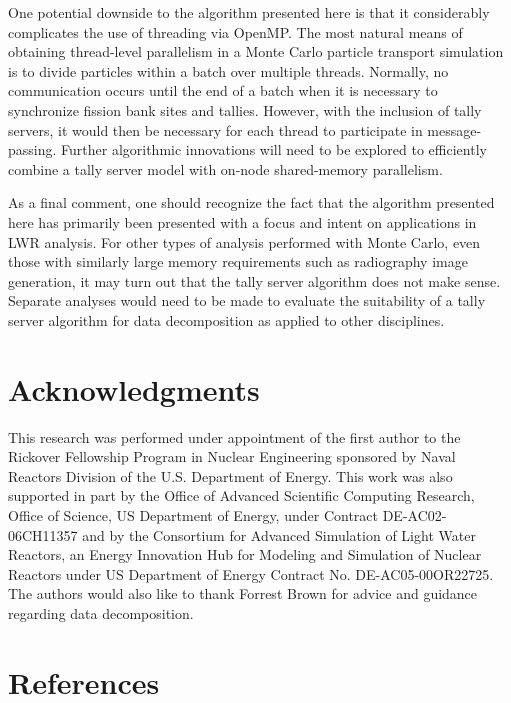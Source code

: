 \documentclass[3p,fleqn]{elsarticle}
\begin{document}
One potential downside to the algorithm presented here is that it considerably
complicates the use of threading via OpenMP. The most natural means of obtaining
thread-level parallelism in a Monte Carlo particle transport simulation is to
divide particles within a batch over multiple threads. Normally, no
communication occurs until the end of a batch when it is necessary to
synchronize fission bank sites and tallies. However, with the inclusion of tally
servers, it would then be necessary for each thread to participate in
message-passing. Further algorithmic innovations will need to be explored to
efficiently combine a tally server model with on-node shared-memory parallelism.

As a final comment, one should recognize the fact that the algorithm presented
here has primarily been presented with a focus and intent on applications in LWR
analysis. For other types of analysis performed with Monte Carlo, even those
with similarly large memory requirements such as radiography image generation,
it may turn out that the tally server algorithm does not make sense. Separate
analyses would need to be made to evaluate the suitability of a tally server
algorithm for data decomposition as applied to other disciplines.

\section*{Acknowledgments}

This research was performed under appointment of the first author to the
Rickover Fellowship Program in Nuclear Engineering sponsored by Naval Reactors
Division of the U.S. Department of Energy. This work was also supported in part
by the Office of Advanced Scientific Computing Research, Office of Science, US
Department of Energy, under Contract DE-AC02-06CH11357 and by the Consortium for
Advanced Simulation of Light Water Reactors, an Energy Innovation Hub for
Modeling and Simulation of Nuclear Reactors under US Department of Energy
Contract No. DE-AC05-00OR22725. The authors would also like to thank Forrest
Brown for advice and guidance regarding data decomposition.

\section*{References}



\end{document}

